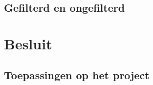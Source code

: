 \documentclass[a4paper,11pt]{article}
\begin{document}
	\subsection{Gefilterd en ongefilterd} \label{subsec:gefilterd en ongefilterd}
		

\section{Besluit}\label{sec:besluit}
	
	
	\subsection{Toepassingen op het project}\label{subsec:toepassingen}
		

\medskip



\end{document}
